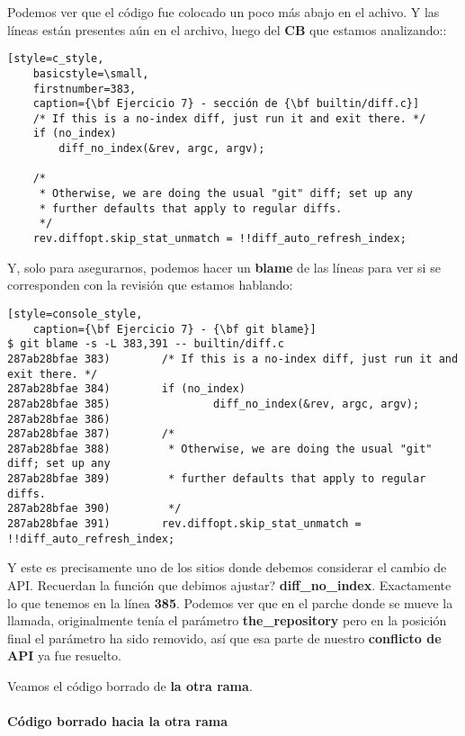 Podemos ver que el código fue colocado un poco más abajo en el achivo. Y las líneas están presentes aún en el archivo, luego del {\bf CB} que estamos
analizando::

\begin{lstlisting}[style=c_style,
	basicstyle=\small,
	firstnumber=383,
	caption={\bf Ejercicio 7} - sección de {\bf builtin/diff.c}]
	/* If this is a no-index diff, just run it and exit there. */
	if (no_index)
		diff_no_index(&rev, argc, argv);

	/*
	 * Otherwise, we are doing the usual "git" diff; set up any
	 * further defaults that apply to regular diffs.
	 */
	rev.diffopt.skip_stat_unmatch = !!diff_auto_refresh_index;
\end{lstlisting}

Y, solo para asegurarnos, podemos hacer un {\bf blame} de las líneas para ver si se corresponden con la revisión que estamos hablando:

\begin{lstlisting}[style=console_style,
	caption={\bf Ejercicio 7} - {\bf git blame}]
$ git blame -s -L 383,391 -- builtin/diff.c
287ab28bfae 383)        /* If this is a no-index diff, just run it and exit there. */
287ab28bfae 384)        if (no_index)
287ab28bfae 385)                diff_no_index(&rev, argc, argv);
287ab28bfae 386) 
287ab28bfae 387)        /*
287ab28bfae 388)         * Otherwise, we are doing the usual "git" diff; set up any
287ab28bfae 389)         * further defaults that apply to regular diffs.
287ab28bfae 390)         */
287ab28bfae 391)        rev.diffopt.skip_stat_unmatch = !!diff_auto_refresh_index;
\end{lstlisting}

Y este es precisamente uno de los sitios donde debemos considerar el cambio de API. Recuerdan la función que debimos ajustar?
{\bf diff\_no\_index}. Exactamente lo que tenemos en la línea {\bf 385}. Podemos ver que en el parche donde se mueve la llamada, originalmente
tenía el parámetro {\bf the\_repository} pero en la posición final el parámetro ha sido removido, así que esa parte de nuestro {\bf conflicto
de API} ya fue resuelto.

Veamos el código borrado de {\bf la otra rama}.

\paragraph{Código borrado hacia la otra rama}

